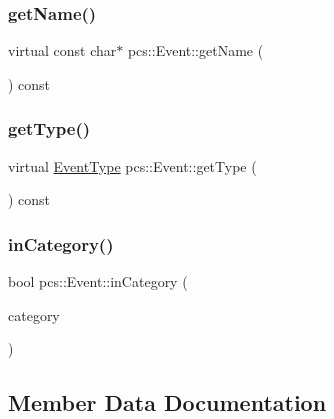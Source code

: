 \subsubsection{\texorpdfstring{get\+Name()}{getName()}}
{\footnotesize\ttfamily virtual const char$\ast$ pcs\+::\+Event\+::get\+Name (\begin{DoxyParamCaption}{ }\end{DoxyParamCaption}) const\hspace{0.3cm}{\ttfamily [pure virtual]}}

\mbox{\label{classpcs_1_1Event_a7ea17b26f979770e7809af854efe0f57}} 
\subsubsection{\texorpdfstring{get\+Type()}{getType()}}
{\footnotesize\ttfamily virtual \hyperlink{namespacepcs_a12954f53e3d7d6a8765fd723e1ce8db4}{Event\+Type} pcs\+::\+Event\+::get\+Type (\begin{DoxyParamCaption}{ }\end{DoxyParamCaption}) const\hspace{0.3cm}{\ttfamily [pure virtual]}}

\mbox{\label{classpcs_1_1Event_ad3d636ba00a11cab150c2fdad81acc93}} 
\subsubsection{\texorpdfstring{in\+Category()}{inCategory()}}
{\footnotesize\ttfamily bool pcs\+::\+Event\+::in\+Category (\begin{DoxyParamCaption}\item[{\hyperlink{namespacepcs_a3538ef524602fc09ddb40acc72480c60}{Event\+Category}}]{category }\end{DoxyParamCaption})\hspace{0.3cm}{\ttfamily [inline]}}



\subsection{Member Data Documentation}
\mbox{\label{classpcs_1_1Event_a24acdd6f068d4b4bbc61cab76f59e0ed}} 
